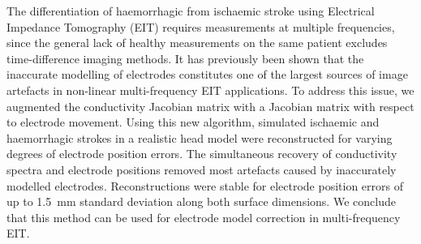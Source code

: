 The differentiation of haemorrhagic from ischaemic stroke using Electrical Impedance Tomography (EIT) requires measurements at multiple frequencies, since the general lack of healthy measurements on the same patient excludes time-difference imaging methods. It has previously been shown that the inaccurate modelling of electrodes constitutes one of the largest sources of image artefacts in non-linear multi-frequency EIT applications. To address this issue, we augmented the conductivity Jacobian matrix with a Jacobian matrix with respect to electrode movement. Using this new algorithm, simulated ischaemic and haemorrhagic strokes in a realistic head model were reconstructed for varying degrees of electrode position errors. The simultaneous recovery of conductivity spectra and electrode positions removed most artefacts caused by inaccurately modelled electrodes. Reconstructions were stable for electrode position errors of up to \SI{1.5}{\milli\metre} standard deviation along both surface dimensions. We conclude that this method can be used for electrode model correction in multi-frequency EIT.

